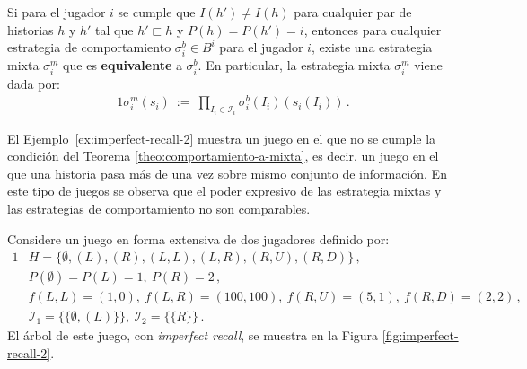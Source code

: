 \begin{theorem}
\label{theo:comportamiento-a-mixta}
Si para el jugador $i$ se cumple que $I(h')\neq I(h)$ para cualquier
par de historias $h$ y $h'$ tal que $h'\sqsubset h$ y $P(h)=P(h')=i$, entonces para cualquier estrategia de comportamiento $\sigma^b_i \in B^i$ para el jugador $i$, existe una estrategia mixta $\sigma^m_i$ que es \textbf{equivalente} a $\sigma^b_i$. En particular, la estrategia mixta $\sigma^m_i$ viene dada por:
\begin{alignat}{1}
\sigma^m_i(s_i)\ :=\ \prod_{I_i \in \mathcal{I}_i} \sigma^b_i(I_i)(s_i(I_i)) \,. \label{eq:comportamiento-a-mixta}
\end{alignat}
\end{theorem}

El Ejemplo~\ref{ex:imperfect-recall-2} muestra un juego en el que no se cumple la condición del Teorema \ref{theo:comportamiento-a-mixta}, es decir, un juego en el que una historia pasa más de una vez sobre mismo conjunto de información. En este tipo de juegos se observa que el poder expresivo de las estrategia mixtas y las estrategias de comportamiento no son comparables.

\begin{example}
\label{ex:imperfect-recall-2}
Considere un juego en forma extensiva de dos jugadores definido por:
\begin{alignat}{1}
    &H = \{ \emptyset, (L), (R), (L,L), (L,R), (R, U), (R, D)\} \,, \\
    &P(\emptyset) = P(L) = 1, \ P(R) = 2 \,, \\
    &f(L, L) = (1, 0), \ f(L, R) = (100, 100), \ f(R, U) = (5, 1), \ f(R, D) = (2, 2) \,, \\
    &\mathcal{I}_1 = \{ \{ \emptyset, (L)\} \}, \ \mathcal{I}_2 = \{ \{ R \} \} \,.
\end{alignat}
El árbol de este juego, con \textit{imperfect recall}, se muestra en la Figura \ref{fig:imperfect-recall-2}.
\end{example}

